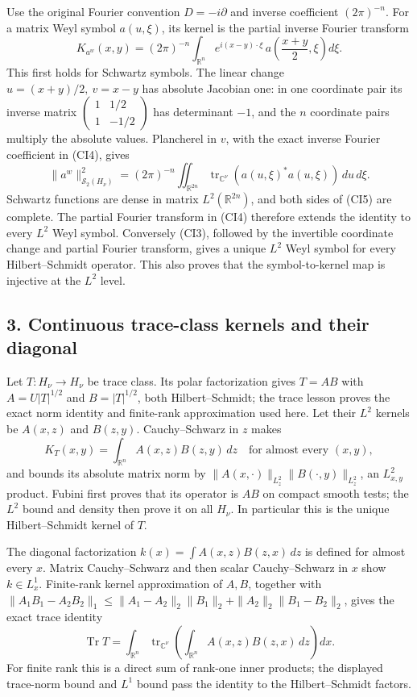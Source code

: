 \documentclass[
  11pt,
]{article}
\begin{document}
Use the original Fourier convention \(D=-i\partial\) and inverse
coefficient \((2\pi)^{-n}\). For a matrix Weyl symbol \(a(u,\xi)\), its
kernel is the partial inverse Fourier transform \[
 K_{a^w}(x,y)
  =(2\pi)^{-n}\int_{\mathbb R^n}
      e^{i(x-y)\cdot\xi}\,
      a\!\left(\frac{x+y}{2},\xi\right)d\xi .
 \tag{CI4}
\] This first holds for Schwartz symbols. The linear change
\(u=(x+y)/2,\ v=x-y\) has absolute Jacobian one: in one coordinate pair
its inverse matrix
\(\left(\begin{smallmatrix}1&1/2\\1&-1/2\end{smallmatrix}\right)\) has
determinant \(-1\), and the \(n\) coordinate pairs multiply the absolute
values. Plancherel in \(v\), with the exact inverse Fourier coefficient
in (CI4), gives \[
 \|a^w\|_{\mathcal S_2(H_\nu)}^2
  =(2\pi)^{-n}\iint_{\mathbb R^{2n}}
       \operatorname{tr}_{\mathbb C^\nu}(a(u,\xi)^*a(u,\xi))
       \,du\,d\xi .
 \tag{CI5}
\] Schwartz functions are dense in matrix \(L^2(\mathbb R^{2n})\), and
both sides of (CI5) are complete. The partial Fourier transform in (CI4)
therefore extends the identity to every \(L^2\) Weyl symbol. Conversely
(CI3), followed by the invertible coordinate change and partial Fourier
transform, gives a unique \(L^2\) Weyl symbol for every Hilbert--Schmidt
operator. This also proves that the symbol-to-kernel map is injective at
the \(L^2\) level.

\subsection{3. Continuous trace-class kernels and their
diagonal}\label{continuous-trace-class-kernels-and-their-diagonal}

Let \(T:H_\nu\to H_\nu\) be trace class. Its polar factorization gives
\(T=AB\) with \(A=U|T|^{1/2}\) and \(B=|T|^{1/2}\), both
Hilbert--Schmidt; the trace lesson proves the exact norm identity and
finite-rank approximation used here. Let their \(L^2\) kernels be
\(A(x,z)\) and \(B(z,y)\). Cauchy--Schwarz in \(z\) makes \[
 K_T(x,y)=\int_{\mathbb R^n}A(x,z)B(z,y)\,dz
 \quad\text{for almost every }(x,y),
 \tag{CI6}
\] and bounds its absolute matrix norm by
\(\|A(x,\cdot)\|_{L^2_z}\|B(\cdot,y)\|_{L^2_z}\), an \(L^2_{x,y}\)
product. Fubini first proves that its operator is \(AB\) on compact
smooth tests; the \(L^2\) bound and density then prove it on all
\(H_\nu\). In particular this is the unique Hilbert--Schmidt kernel of
\(T\).

The diagonal factorization \(k(x)=\int A(x,z)B(z,x)\,dz\) is defined for
almost every \(x\). Matrix Cauchy--Schwarz and then scalar
Cauchy--Schwarz in \(x\) show \(k\in L^1_x\). Finite-rank kernel
approximation of \(A,B\), together with \(\|A_1B_1-A_2B_2\|_1
\leq\|A_1-A_2\|_2\|B_1\|_2+\|A_2\|_2\|B_1-B_2\|_2\), gives the exact
trace identity \[
 \operatorname{Tr}T
  =\int_{\mathbb R^n}\operatorname{tr}_{\mathbb C^\nu}
           \left(\int_{\mathbb R^n}A(x,z)B(z,x)\,dz\right)dx.
 \tag{CI7}
\] For finite rank this is a direct sum of rank-one inner products; the
displayed trace-norm bound and \(L^1\) bound pass the identity to the
Hilbert--Schmidt factors.
\end{document}
